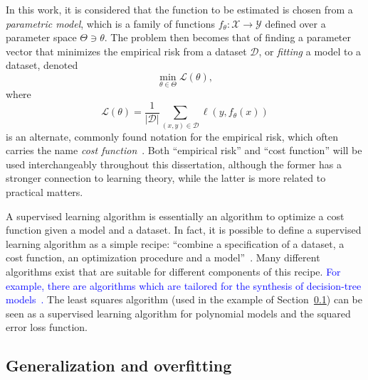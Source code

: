 In this work, it is considered that the function to be estimated is chosen from a \emph{parametric model}\footnotemark, which is a family of functions $f_\theta: \mathcal{X} \longrightarrow \mathcal{Y}$ defined over a parameter space $\Theta \ni \theta$.
The problem then becomes that of finding a parameter vector that minimizes the empirical risk from a dataset $\mathcal{D}$, or \emph{fitting} a model to a dataset, denoted
\begin{equation}\label{eq:cost-minimization}
    \min_{\theta \in  \Theta} \mathcal{L}(\theta)
,\end{equation}
where
\begin{equation}\label{eq:cost-function}
    \mathcal{L}(\theta) = \frac{1}{|\mathcal{D}|} \sum_{(x,y)\in \mathcal{D}} \ell(y, f_\theta(x))
\end{equation}
is an alternate, commonly found notation for the empirical risk, which often carries the name \emph{cost function}~\cite{murphyMachineLearningProbabilistic2013,Goodfellow-et-al-2016}.
Both ``empirical risk'' and ``cost function'' will be used interchangeably throughout this dissertation, although the former has a stronger connection to learning theory, while the latter is more related to practical matters.

A supervised learning algorithm is essentially an algorithm to optimize a cost function given a model and a dataset.
In fact, it is possible to define a supervised learning algorithm as a simple recipe: ``combine a speciﬁcation of a dataset, a cost function, an optimization procedure and a model''~\cite{Goodfellow-et-al-2016}.
Many different algorithms exist that are suitable for different components of this recipe.
\textcolor{blue}{For example, there are algorithms which are tailored for the synthesis of decision-tree models~\cite{breimanClassificationRegressionTrees2017}.}
The least squares algorithm (used in the example of Section~\ref{sec:generalization-overfitting}) can be seen as a supervised learning algorithm for polynomial models and the squared error loss function.


\subsection{Generalization and overfitting}\label{sec:generalization-overfitting}

